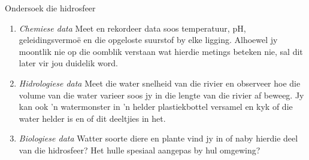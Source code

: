 \begin{Investigation}{Ondersoek die hidrosfeer }
\begin{enumerate}[noitemsep, label=\textbf{\arabic*}. ]
            \label{m38138*uid6}\item \textsl{Chemiese data}
Meet en rekordeer data soos temperatuur, pH, geleidingsvermoë en die opgeloste suurstof by elke ligging. Alhoewel jy moontlik nie op die oomblik verstaan wat hierdie metings beteken nie, sal dit later vir jou duidelik word.
\label{m38138*uid7}\item \textsl{Hidrologiese data}
Meet die water snelheid van die rivier en observeer hoe die volume van die water varieer soos jy in die lengte van die rivier af beweeg. Jy kan ook  'n watermonster in  'n helder plastiekbottel versamel en kyk of die water helder is en of dit deeltjies in het.
\label{m38138*uid8}\item \textsl{Biologiese data}
Watter soorte diere en plante vind jy in of naby hierdie deel van die hidrosfeer? Het hulle spesiaal aangepas by hul omgewing?
\end{enumerate}


\end{Investigation}
